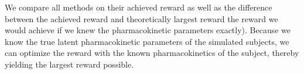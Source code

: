 We compare all methods on their achieved reward as well as the difference between the achieved reward and theoretically largest reward the reward we would achieve if we knew the pharmacokinetic parameters exactly).  Because we know the true latent pharmacokinetic parameters of the simulated subjects, we can optimize the reward with the known pharmacokinetics of the subject, thereby yielding the largest reward possible.

